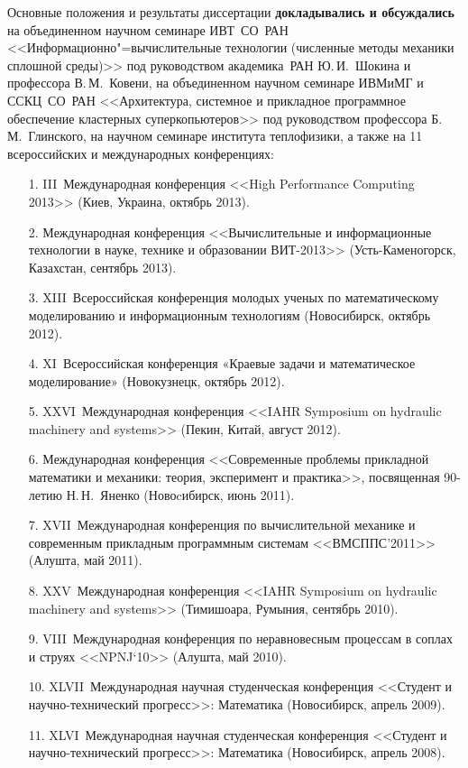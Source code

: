 Основные положения и результаты диссертации \textbf{докладывались и обсуждались} 
на объединенном научном семинаре ИВТ~СО~РАН <<Информационно"=вычислительные технологии 
(численные методы механики сплошной среды)>> под руководством академика~РАН Ю.\,И.~Шокина и 
профессора В.\,М.~Ковени, на объединенном научном семинаре ИВМиМГ и ССКЦ~СО~РАН <<Архитектура, системное и 
прикладное программное обеспечение кластерных суперкопьютеров>> под руководством профессора Б.\,М.~Глинского, 
на научном семинаре института теплофизики, а также на 11 всероссийских и международных конференциях:
\begin{enumerate}
  \item[1.] III~Международная конференция <<High Performance Computing 2013>> 
            (Киев, Украина, октябрь 2013).
  \item[2.] Международная конференция <<Вычислительные и информационные технологии в науке, 
            технике и образовании ВИТ-2013>> (Усть-Каменогорск, Казахстан, сентябрь 2013).
  \item[3.] XIII~Всероссийская конференция молодых ученых по математическому моделированию и информационным 
            технологиям (Новосибирск, октябрь 2012).
  \item[4.] XI~Всероссийская конференция «Краевые задачи и математическое моделирование» 
            (Новокузнецк, октябрь 2012).
  \item[5.] XXVI~Международная конференция <<IAHR Symposium on hydraulic machinery and systems>>
            (Пекин, Китай, август 2012).
  \item[6.] Международная конференция <<Современные проблемы прикладной математики и механики: теория, 
            эксперимент и практика>>, посвященная 90-летию Н.\,Н.~Яненко (Новоcибирск, июнь 2011).
  \item[7.] XVII~Международная конференция по вычислительной механике и современным прикладным 
            программным системам <<ВМСППС’2011>> (Алушта, май 2011).
  \item[8.] XXV~Международная конференция <<IAHR Symposium on hydraulic machinery and systems>> (Тимишоара, 
            Румыния, сентябрь 2010).
  \item[9.] VIII~Международная конференция по неравновесным процессам в соплах и струях <<NPNJ`10>> (Алушта, 
            май 2010).
  \item[10.]XLVII~Международная научная студенческая конференция <<Студент и научно-технический прогресс>>:
            Математика (Новосибирск, апрель 2009).
  \item[11.]XLVI~Международная научная студенческая конференция <<Студент и научно-технический прогресс>>:
            Математика (Новосибирск, апрель 2008).
\end{enumerate} 

